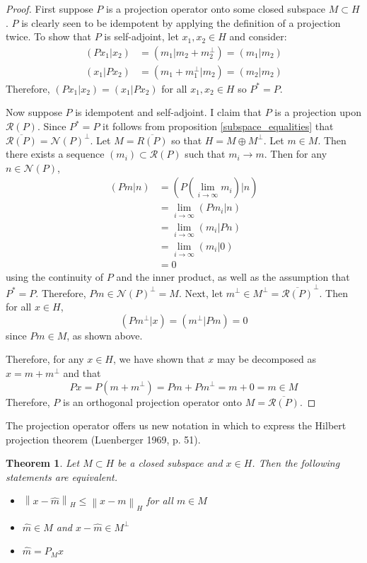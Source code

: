 \documentclass[12pt]{article}
\newcommand*{\norm}[1]{\left\lVert#1\right\rVert}
\newcommand{\R}{\mathcal{R}}
\newcommand{\N}{\mathcal{N}}
\newtheorem{thm}{Theorem}
\begin{document}
\begin{proof} 
First suppose $P$ is a projection operator onto some closed subspace $M \subset H$. $P$ is clearly seen 
to be idempotent by applying the definition of a projection twice. To show that $P$ is self-adjoint, let $x_1, x_2 \in H$
and consider: 
\begin{align*} 
(Px_1|x_2) &= (m_1|m_2 + m_2^\perp) = (m_1|m_2) \\
(x_1|Px_2) &= (m_1 + m_1^\perp|m_2) = (m_2|m_2)
\end{align*} 
Therefore, $(Px_1|x_2) = (x_1|Px_2)$ for all $x_1, x_2 \in H$ so $P^* = P$. 

Now suppose $P$ is idempotent and self-adjoint. I claim that $P$ is a projection
upon $\R(P)$. Since $P^* = P$ it follows from proposition \eqref{subspace_equalities}
that $\overline{\R(P)} = \N(P)^\perp$. Let $M = \overline{R(P)}$ so that $H = M \oplus M^\perp$. 
Let $m \in M$. Then there exists a sequence $(m_i) \subset \R(P)$ such that $m_i \to m$. Then for any $n \in \N(P)$,
\begin{align*} 
(Pm|n) &= (P(\lim_{i \to \infty} m_i)|n) \\
            &= \lim_{i \to \infty} (Pm_i|n) \\
            &= \lim_{i \to \infty} (m_i|Pn) \\
            &= \lim_{i \to \infty} (m_i|0) \\
            &= 0
\end{align*} 
using the continuity of $P$ and the inner product, as well as the assumption that $P^* = P$. 
Therefore, $Pm \in \N(P)^\perp = M$. 
Next, let $m^\perp \in M^\perp = \overline{\R(P)}^\perp$. Then for all $x \in H$, 
\[(Pm^\perp|x) = (m^\perp|Pm) = 0\]
since $Pm \in M$, as shown above. 

Therefore, for any $x \in H$, we have shown that $x$ may be decomposed as $x = m + m^\perp$
and that \[Px = P(m + m^\perp) = Pm + Pm^\perp = m + 0 = m \in M\]
Therefore, $P$ is an orthogonal projection operator onto $M = \overline{\R(P)}$. 
\end{proof} 

The projection operator offers us new notation in which to express the Hilbert projection theorem (Luenberger 1969, p. 51). 
\begin{thm} \label{projection_theorem}
Let $M \subset H$ be a closed subspace and $x \in H$. Then the following statements are equivalent. 
\begin{itemize} 
\item $\norm{x - \hat{m}}_H \leq \norm{x - m}_H$ for all $m \in M$ 
\item $\hat{m} \in M$ and $x - \hat{m} \in M^\perp$
\item $\hat{m} = P_M x$
\end{itemize} 
\end{thm} 
\end{document}
